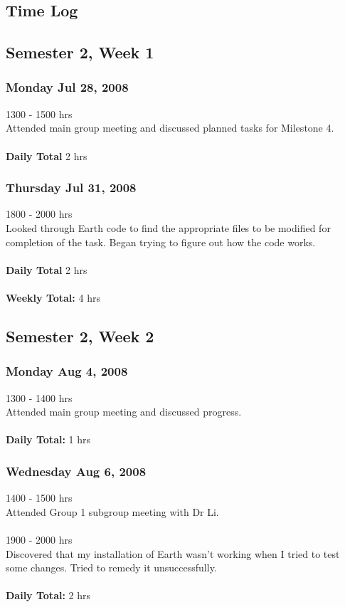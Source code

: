 \documentclass[10pt,a4,oneside]{article}
\begin{document}
\subsection*{Time Log}
\label{time-log}
\subsection*{Semester 2, Week 1}
\subsubsection*{Monday Jul 28, 2008}
1300 - 1500 hrs\\
Attended main group meeting and discussed planned tasks for Milestone 4.\\
\\
\textbf{Daily Total} 2 hrs\\

\subsubsection*{Thursday Jul 31, 2008}
1800 - 2000 hrs\\
Looked through Earth code to find the appropriate files to be modified for completion of the task. Began trying to figure out how the code works.\\
\\
\textbf{Daily Total} 2 hrs\\
\\
\textbf{Weekly Total:} 4 hrs

\subsection*{Semester 2, Week 2}
\subsubsection*{Monday Aug 4, 2008}
1300 - 1400 hrs\\
Attended main group meeting and discussed progress.\\
\\
\textbf{Daily Total:} 1 hrs

\subsubsection*{Wednesday Aug 6, 2008}
1400 - 1500 hrs\\
Attended Group 1 subgroup meeting with Dr Li.\\
\\
1900 - 2000 hrs\\
Discovered that my installation of Earth wasn't working when I tried to test some changes. Tried to remedy it unsuccessfully.\\
\\
\textbf{Daily Total:} 2 hrs\\
\end{document}
